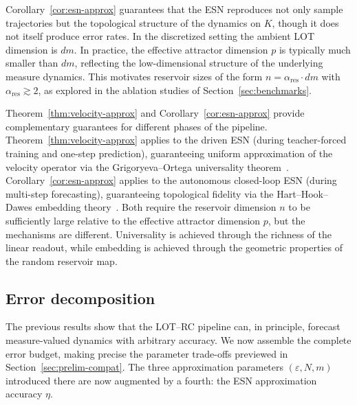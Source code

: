 \documentclass[11pt]{article}
\newcommand{\1}{\mathbf{1}}
\begin{document}
\begin{remark}\label{rem:esn-interpret}
Corollary~\ref{cor:esn-approx} guarantees that the ESN reproduces not only sample trajectories but the topological structure of the dynamics on $K$, though it does not itself produce error rates. In the discretized setting
the ambient LOT dimension is $dm$. In practice, the effective attractor
dimension $p$ is typically much smaller than $dm$, reflecting the
low-dimensional structure of the underlying measure dynamics. This
motivates reservoir sizes of the form
$n = \alpha_{\mathrm{res}} \cdot dm$ with
$\alpha_{\mathrm{res}} \gtrsim 2$, as explored in the ablation studies of
Section~\ref{sec:benchmarks}.
\end{remark}

\begin{remark}\label{rem:driven-vs-auto}
Theorem~\ref{thm:velocity-approx} and Corollary~\ref{cor:esn-approx}
provide complementary guarantees for different phases of the pipeline.
Theorem~\ref{thm:velocity-approx} applies to the driven ESN (during
teacher-forced training and one-step prediction), guaranteeing uniform
approximation of the velocity operator via the Grigoryeva--Ortega
universality theorem~\cite{GrigoryevaOrtega2018}.
Corollary~\ref{cor:esn-approx} applies to the autonomous
closed-loop ESN (during multi-step forecasting), guaranteeing topological
fidelity via the Hart--Hook--Dawes embedding
theory~\cite{Hart_2020}. Both require the reservoir dimension $n$ to be
sufficiently large relative to the effective attractor dimension $p$, but
the mechanisms are different. Universality is achieved through the richness
of the linear readout, while embedding is achieved through the geometric
properties of the random reservoir map.
\end{remark}


\subsection{Error decomposition}\label{sec:error-decomp}

The previous results show that the LOT--RC pipeline can, in principle, forecast measure-valued dynamics with arbitrary accuracy. We now assemble the complete error budget, making precise the parameter trade-offs previewed in  Section~\ref{sec:prelim-compat}. The three approximation parameters $(\varepsilon, N, m)$ introduced there are now augmented by a fourth: the ESN approximation accuracy $\eta$. 
\end{document}
